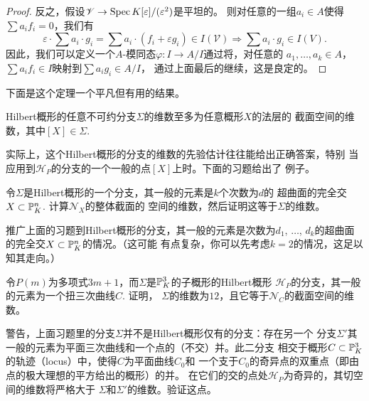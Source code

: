 \begin{proof}
反之，假设$\mathscr V\to \spec K[\varepsilon]/(\varepsilon^2)$是平坦的。
则对任意的一组$a_i\in A$使得$\sum a_if_i=0$，我们有
\[
    \varepsilon \cdot \sum a_{i} \cdot g_{i}=\sum a_{i} \cdot (f_{i}
    +\varepsilon g_{i}) \in I(\mathscr{V}) \Longrightarrow 
    \sum a_{i} \cdot g_{i} \in I(V).
\]
因此，我们可以定义一个$A$-模同态$\varphi:I\to A/I$通过将，对任意的
$a_1,\dots,a_k\in A$，$\sum a_if_i\in I$映射到$\sum a_ig_i\in A/I$，
通过上面最后的继续，这是良定的。
\end{proof}

下面是这个定理一个平凡但有用的结果。

\begin{coro}\label{coro:6.30}
Hilbert概形的任意不可约分支$\Sigma$的维数至多为任意概形$X$的法层的
截面空间的维数，其中$[X]\in \Sigma$.
\end{coro}

实际上，这个Hilbert概形的分支的维数的先验估计往往能给出正确答案，特别
当应用到$\mathscr H_P$的分支的一个一般的点$[X]$上时。下面的习题给出了
例子。

\begin{exe}\label{exe:6.31}
    令$\Sigma$是Hilbert概形的一个分支，其一般的元素是$k$个次数为$d$的
    超曲面的完全交$X\subset \P_K^n$. 计算$\mathscr N_X$的整体截面的
    空间的维数，然后证明这等于$\Sigma$的维数。
\end{exe}

\begin{exe}\label{exe:6.32}
    推广上面的习题到Hilbert概形的分支，其一般的元素是次数为$d_1$,
    $\dots$, $d_k$的超曲面的完全交$X\subset \P_K^n$的情况。（这可能
    有点复杂，你可以先考虑$k=2$的情况，这足以知其走向。）
\end{exe}

\begin{exe}\label{exe:6.33}
    令$P(m)$为多项式$3m+1$，而$\Sigma$是$\P_K^3$的子概形的Hilbert概形
    $\mathscr H_P$的分支，其一般的元素为一个扭三次曲线$C$. 证明，
    $\Sigma$的维数为$12$，且它等于$\mathscr N_C$的截面空间的维数。
    \nottran
\end{exe}


\begin{exe}\label{exe:6.34}
警告，上面习题里的分支$\Sigma$并不是Hilbert概形仅有的分支：存在另一个
分支$\Sigma'$其一般的元素为平面三次曲线和一个点的（不交）并。此二分支
相交于概形$C\subset \P_K^3$的轨迹（locus）中，使得$C$为平面曲线$C_0$和
一个支于$C_0$的奇异点的双重点（即由点的极大理想的平方给出的概形）的并。
在它们的交的点处$\mathscr H_P$为奇异的，其切空间的维数将严格大于
$\Sigma$和$\Sigma'$的维数。验证这点。
\end{exe}

